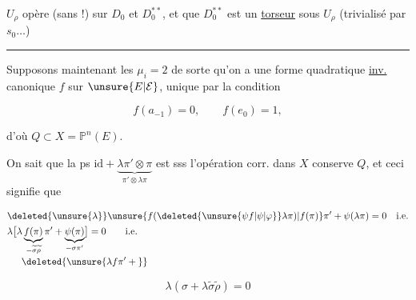 $U_\rho$ opère (sans !) sur $D_0$ et $D_0^{**}$, et que $D_0^{**}$ est un \uline{torseur} sous $U_\rho$\unsure{,} (trivialisé par $s_0\ldots$)

\begin{center}\rule{2.1cm}{0.35pt}\end{center}

Supposons maintenant les $\mu_i=2$ de sorte qu'on a une forme quadratique \uline{inv.} canonique $f$ sur $\unsure{E|\mathcal E}$, unique par la condition

\[
f(a_{-1})=0,\qquad f(e_0)=1,
\]

 d'où $Q\subset X=\mathbb P^{n}(E)$.

On sait que la ps  $\mathrm{id}+\underbrace{\lambda\pi'\otimes\pi}_{\pi'\otimes\lambda\pi}$ est   sss l'opération corr. dans $X$ conserve $Q$, et ceci signifie que

\[
\begin{aligned}
&\deleted{\unsure{\lambda}}\unsure{f(\deleted{\unsure{\psi f|\psi|\varphi}}\lambda\pi)|f(\pi)}\pi'+\psi(\lambda\pi)=0\quad\text{i.e.}\\
&\lambda\bigl[\lambda\underbrace{f(\pi)}_{-\widetilde\sigma\widetilde\rho}\pi'+\underbrace{\psi(\pi)}_{-\sigma\pi'}\bigr]=0\qquad\text{i.e.}\\[-2pt]
&\hspace{1.5em}\deleted{\unsure{\lambda f\pi'+{}}}
\end{aligned}
\]

\[
\lambda(\sigma+\lambda\widetilde\sigma\widetilde\rho)=0
\tag*{$(**)$}
\]
